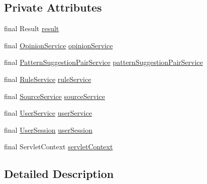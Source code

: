 \subsection*{Private Attributes}
\begin{DoxyCompactItemize}
\item 
final Result \hyperlink{classbr_1_1usp_1_1cata_1_1web_1_1controller_1_1_suggestions_controller_a85db022274cecf47328b7ae6eada749c}{result}
\item 
final \hyperlink{classbr_1_1usp_1_1cata_1_1service_1_1_opinion_service}{Opinion\+Service} \hyperlink{classbr_1_1usp_1_1cata_1_1web_1_1controller_1_1_suggestions_controller_a3736df2e57069c47dbfa3553bd6b12e6}{opinion\+Service}
\item 
final \hyperlink{classbr_1_1usp_1_1cata_1_1service_1_1_pattern_suggestion_pair_service}{Pattern\+Suggestion\+Pair\+Service} \hyperlink{classbr_1_1usp_1_1cata_1_1web_1_1controller_1_1_suggestions_controller_a30ec0498fb9a213449943cc44480af49}{pattern\+Suggestion\+Pair\+Service}
\item 
final \hyperlink{classbr_1_1usp_1_1cata_1_1service_1_1_rule_service}{Rule\+Service} \hyperlink{classbr_1_1usp_1_1cata_1_1web_1_1controller_1_1_suggestions_controller_a6d0b3f8552a53916a5d093c6b1e9be21}{rule\+Service}
\item 
final \hyperlink{classbr_1_1usp_1_1cata_1_1service_1_1_source_service}{Source\+Service} \hyperlink{classbr_1_1usp_1_1cata_1_1web_1_1controller_1_1_suggestions_controller_afb0a528cde713db192026ca71622462c}{source\+Service}
\item 
final \hyperlink{classbr_1_1usp_1_1cata_1_1service_1_1_user_service}{User\+Service} \hyperlink{classbr_1_1usp_1_1cata_1_1web_1_1controller_1_1_suggestions_controller_a51d45abbc26a3f63957ca2da9da24252}{user\+Service}
\item 
final \hyperlink{classbr_1_1usp_1_1cata_1_1web_1_1controller_1_1_user_session}{User\+Session} \hyperlink{classbr_1_1usp_1_1cata_1_1web_1_1controller_1_1_suggestions_controller_a80cc6dcb0ec54ab53e01bcb2a71e4844}{user\+Session}
\item 
final Servlet\+Context \hyperlink{classbr_1_1usp_1_1cata_1_1web_1_1controller_1_1_suggestions_controller_a559b3d53442e1b57f7149448935c8fcf}{servlet\+Context}
\end{DoxyCompactItemize}


\subsection{Detailed Description}



